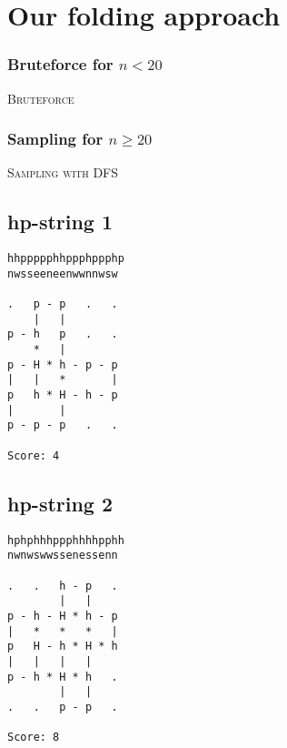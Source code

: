 \documentclass[a4paper,oneside,article,11pt]{memoir}
\begin{document}
\chapter*{Our folding approach}
\subsection*{Bruteforce for $n < 20$}
\begin{algorithm}[H]
\caption{\textsc{Bruteforce}}
\begin{algorithmic}[1]
			\ENDIF
		\ENDIF
	\ENDFOR
\end{algorithmic}
\end{algorithm}

\subsection*{Sampling for $n \geq 20$}
\begin{algorithm}[H]
\caption{\textsc{Sampling with DFS}}
\begin{algorithmic}[1]
		\ENDIF
	\ENDWHILE
\end{algorithmic}
\end{algorithm}
\clearpage

\section*{hp-string 1}
\begin{lstlisting}[basicstyle=\ttfamily]
hhppppphhppphppphp
nwsseeneenwwnnwsw

.   p - p   .   .  
    |   |          
p - h   p   .   .  
    *   |          
p - H * h - p - p  
|   |   *       |  
p   h * H - h - p  
|       |          
p - p - p   .   .

Score: 4
\end{lstlisting}

\pagebreak

\section*{hp-string 2}
\begin{lstlisting}[basicstyle=\ttfamily]
hphphhhppphhhhpphh
nwnwswwssenessenn

.   .   h - p   .  
        |   |      
p - h - H * h - p  
|   *   *   *   |  
p   H - h * H * h  
|   |   |   |      
p - h * H * h   .  
        |   |      
.   .   p - p   .  
                   
Score: 8
\end{lstlisting}
\end{document}
